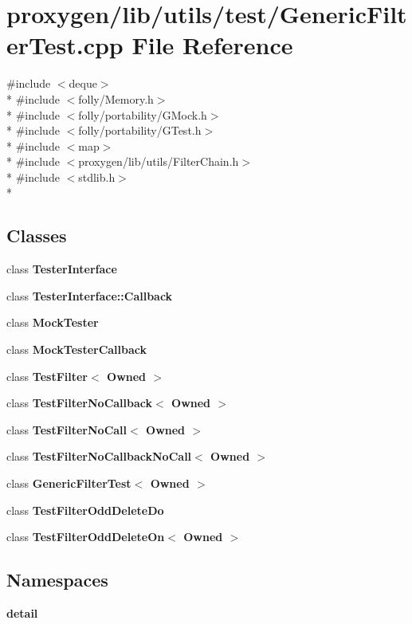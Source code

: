 \section{proxygen/lib/utils/test/\+Generic\+Filter\+Test.cpp File Reference}
\label{GenericFilterTest_8cpp}
{\ttfamily \#include $<$deque$>$}\\*
{\ttfamily \#include $<$folly/\+Memory.\+h$>$}\\*
{\ttfamily \#include $<$folly/portability/\+G\+Mock.\+h$>$}\\*
{\ttfamily \#include $<$folly/portability/\+G\+Test.\+h$>$}\\*
{\ttfamily \#include $<$map$>$}\\*
{\ttfamily \#include $<$proxygen/lib/utils/\+Filter\+Chain.\+h$>$}\\*
{\ttfamily \#include $<$stdlib.\+h$>$}\\*
\subsection*{Classes}
\begin{DoxyCompactItemize}
\item 
class {\bf Tester\+Interface}
\item 
class {\bf Tester\+Interface\+::\+Callback}
\item 
class {\bf Mock\+Tester}
\item 
class {\bf Mock\+Tester\+Callback}
\item 
class {\bf Test\+Filter$<$ Owned $>$}
\item 
class {\bf Test\+Filter\+No\+Callback$<$ Owned $>$}
\item 
class {\bf Test\+Filter\+No\+Call$<$ Owned $>$}
\item 
class {\bf Test\+Filter\+No\+Callback\+No\+Call$<$ Owned $>$}
\item 
class {\bf Generic\+Filter\+Test$<$ Owned $>$}
\item 
class {\bf Test\+Filter\+Odd\+Delete\+Do}
\item 
class {\bf Test\+Filter\+Odd\+Delete\+On$<$ Owned $>$}
\end{DoxyCompactItemize}
\subsection*{Namespaces}
\begin{DoxyCompactItemize}
\item 
 {\bf detail}
\end{DoxyCompactItemize}
